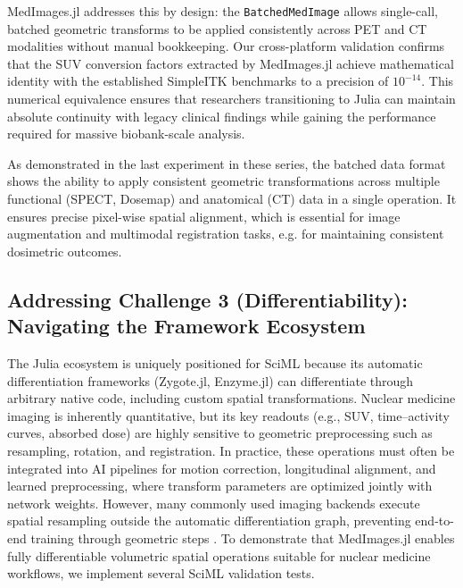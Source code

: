 \documentclass[a4paper,10pt]{elsarticle}
\begin{document}
MedImages.jl addresses this by design: the \texttt{BatchedMedImage} allows single-call, batched geometric transforms to be applied consistently across PET and CT modalities without manual bookkeeping. Our cross-platform validation confirms that the SUV conversion factors extracted by MedImages.jl achieve mathematical identity with the established SimpleITK benchmarks to a precision of $10^{-14}$. This numerical equivalence ensures that researchers transitioning to Julia can maintain absolute continuity with legacy clinical findings while gaining the performance required for massive biobank-scale analysis.

As demonstrated in the last experiment in these series, the batched data format shows the ability to apply consistent geometric transformations across multiple functional (SPECT, Dosemap) and anatomical (CT) data in a single operation. It ensures precise pixel-wise spatial alignment, which is essential for image augmentation and multimodal registration tasks, e.g. for maintaining consistent dosimetric outcomes.  

\subsection*{Addressing Challenge 3 (Differentiability): Navigating the Framework Ecosystem}

The Julia ecosystem is uniquely positioned for SciML because its automatic differentiation frameworks (Zygote.jl, Enzyme.jl) can differentiate through arbitrary native code, including custom spatial transformations. Nuclear medicine imaging is inherently quantitative, but its key readouts (e.g., SUV, time–activity curves, absorbed dose) are highly sensitive to geometric preprocessing such as resampling, rotation, and registration. In practice, these operations must often be integrated into AI pipelines for motion correction, longitudinal alignment, and learned preprocessing, where transform parameters are optimized jointly with network weights. However, many commonly used imaging backends execute spatial resampling outside the automatic differentiation graph, preventing end-to-end training through geometric steps \cite{Berman_2024}. To demonstrate that MedImages.jl enables fully differentiable volumetric spatial operations suitable for nuclear medicine workflows, we implement several SciML validation tests.
\end{document}
